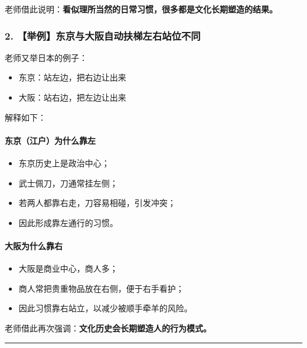 \documentclass[
  chinese,
  9pt,
  a4paper,
]{ctexart}
\providecommand{\tightlist}{%
  \setlength{\itemsep}{0pt}\setlength{\parskip}{0pt}}
\begin{document}
老师借此说明：\textbf{看似理所当然的日常习惯，很多都是文化长期塑造的结果。}

\subsubsection{2.
【举例】东京与大阪自动扶梯左右站位不同}\label{ux4e3eux4f8bux4e1cux4eacux4e0eux5927ux962aux81eaux52a8ux6276ux68afux5de6ux53f3ux7ad9ux4f4dux4e0dux540c}

老师又举日本的例子：

\begin{itemize}
\tightlist
\item
  东京：站左边，把右边让出来
\item
  大阪：站右边，把左边让出来
\end{itemize}

解释如下：

\paragraph{东京（江户）为什么靠左}\label{ux4e1cux4eacux6c5fux6237ux4e3aux4ec0ux4e48ux9760ux5de6}

\begin{itemize}
\tightlist
\item
  东京历史上是政治中心；
\item
  武士佩刀，刀通常挂左侧；
\item
  若两人都靠右走，刀容易相碰，引发冲突；
\item
  因此形成靠左通行的习惯。
\end{itemize}

\paragraph{大阪为什么靠右}\label{ux5927ux962aux4e3aux4ec0ux4e48ux9760ux53f3}

\begin{itemize}
\tightlist
\item
  大阪是商业中心，商人多；
\item
  商人常把贵重物品放在右侧，便于右手看护；
\item
  因此习惯靠右站立，以减少被顺手牵羊的风险。
\end{itemize}

老师借此再次强调：\textbf{文化历史会长期塑造人的行为模式。}

\begin{center}\rule{0.5\linewidth}{0.5pt}\end{center}
\end{document}
